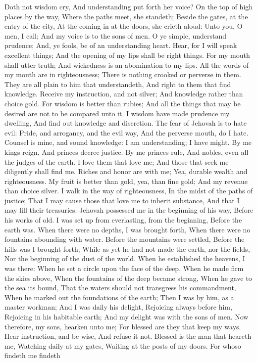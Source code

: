 Doth not wisdom cry, And understanding put forth her voice?  On the top of high places by the way, Where the paths meet, she standeth;  Beside the gates, at the entry of the city, At the coming in at the doors, she crieth aloud:  Unto you, O men, I call; And my voice is to the sons of men.  O ye simple, understand prudence; And, ye fools, be of an understanding heart.  Hear, for I will speak excellent things; And the opening of my lips shall be right things.  For my mouth shall utter truth; And wickedness is an abomination to my lips.  All the words of my mouth are in righteousness; There is nothing crooked or perverse in them.  They are all plain to him that understandeth, And right to them that find knowledge.  Receive my instruction, and not silver; And knowledge rather than choice gold.  For wisdom is better than rubies; And all the things that may be desired are not to be compared unto it.  I wisdom have made prudence my dwelling, And find out knowledge and discretion.  The fear of Jehovah is to hate evil: Pride, and arrogancy, and the evil way, And the perverse mouth, do I hate.  Counsel is mine, and sound knowledge: I am understanding; I have might.  By me kings reign, And princes decree justice.  By me princes rule, And nobles, even all the judges of the earth.  I love them that love me; And those that seek me diligently shall find me.  Riches and honor are with me; Yea, durable wealth and righteousness.  My fruit is better than gold, yea, than fine gold; And my revenue than choice silver.  I walk in the way of righteousness, In the midst of the paths of justice;  That I may cause those that love me to inherit substance, And that I may fill their treasuries.  Jehovah possessed me in the beginning of his way, Before his works of old.  I was set up from everlasting, from the beginning, Before the earth was.  When there were no depths, I was brought forth, When there were no fountains abounding with water.  Before the mountains were settled, Before the hills was I brought forth;  While as yet he had not made the earth, nor the fields, Nor the beginning of the dust of the world.  When he established the heavens, I was there: When he set a circle upon the face of the deep,  When he made firm the skies above, When the fountains of the deep became strong,  When he gave to the sea its bound, That the waters should not transgress his commandment, When he marked out the foundations of the earth;  Then I was by him, as a master workman; And I was daily his delight, Rejoicing always before him,  Rejoicing in his habitable earth; And my delight was with the sons of men.  Now therefore, my sons, hearken unto me; For blessed are they that keep my ways.  Hear instruction, and be wise, And refuse it not.  Blessed is the man that heareth me, Watching daily at my gates, Waiting at the posts of my doors.  For whoso findeth me findeth 